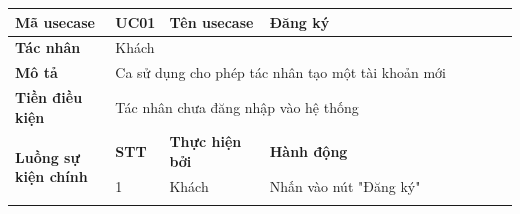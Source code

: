 \documentclass[../DoAn.tex]{subfiles}
\begin{document}
\begin{table}[ht]
    \renewcommand{\arraystretch}{1.2}
    \centering
    \begin{tabular}{| p{0.2\linewidth} | p{0.1\linewidth} | p{0.2\linewidth} | p{0.5\linewidth} |}
        \hline
        \textbf{Mã usecase}                                          & UC01                                                                                   & \textbf{Tên usecase}                                       & Đăng ký                                                                                                                 \\ \hline
        \multicolumn{1}{|p{0.2\linewidth}|}{\textbf{Tác nhân}}       & \multicolumn{3}{p{0.8\linewidth}|}{Khách}                                                                                                                                                                                                                                     \\ \hline
        \multicolumn{1}{|p{0.2\linewidth}|}{\textbf{Mô tả}}          & \multicolumn{3}{p{0.8\linewidth}|}{Ca sử dụng cho phép tác nhân tạo một tài khoản mới}                                                                                                                                                                                        \\ \hline
        \multicolumn{1}{|p{0.2\linewidth}|}{\textbf{Tiền điều kiện}} & \multicolumn{3}{p{0.8\linewidth}|}{Tác nhân chưa đăng nhập vào hệ thống}                                                                                                                                                                                                      \\ \hline
        \multirow{12}{\linewidth}{\textbf{Luồng sự kiện chính}}      & \multicolumn{1}{p{0.1\linewidth}|}{\textbf{STT}}                                       & \multicolumn{1}{p{0.2\linewidth}|}{\textbf{Thực hiện bởi}} & \multicolumn{1}{p{0.5\linewidth}|}{\textbf{Hành động}}                                                                  \\ \cline{2-4}
                                                                     & \multicolumn{1}{p{0.1\linewidth}|}{1}                                                  & \multicolumn{1}{p{0.2\linewidth}|}{Khách}                  & \multicolumn{1}{p{0.5\linewidth}|}{Nhấn vào nút "Đăng ký"}                                                              \\ \cline{2-4}

\end{tabular}
\end{table}
\end{document}
